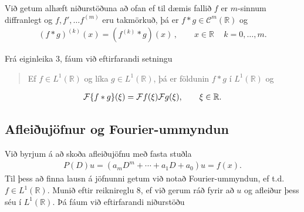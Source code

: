 \documentclass[a4paper,10pt,icelandic]{sphinxmanual}
\begin{document}
Við getum alhæft niðurstöðuna að ofan ef til dæmis fallið \(f\) er \(m\)-sinnum diffranlegt og \(f, f', \dots f^{(m)}\) eru takmörkuð, þá er \(f\ast g \in\mathcal{C}^m(\mathbb{R})\) og
\begin{equation*}
\begin{split}(f\ast g)^{(k)}(x)= (f^{(k)}\ast g)(x)\,, \qquad x\in\mathbb{R}\, \quad k=0, \dots, m.\end{split}
\end{equation*}

Frá eiginleika 3, fáum við eftirfarandi setningu
\begin{quote}

Ef \(f\in L^1(\mathbb R)\) og líka \(g\in L^1(\mathbb R)\), þá er földunin \(f\ast g\) í \(L^1(\mathbb R)\) og
\end{quote}
\begin{equation*}
\begin{split}{{\cal F}}\{f\ast g\}(\xi)={{\cal F}}f(\xi){{\cal F}}g(\xi), \qquad \xi\in {{\mathbb  R}}.\end{split}
\end{equation*}

\subsection{Afleiðujöfnur og Fourier-ummyndun}
\label{\detokenize{Kafli04:afleiujofnur-og-fourier-ummyndun}}
Við byrjum á að skoða afleiðujöfnu með fasta stuðla
\begin{equation*}
\begin{split}P(D)u=(a_mD^ m+\cdots+a_1D+a_0)u=f(x).\end{split}
\end{equation*}
Til þess að finna lausn á jöfnunni getum við notað Fourier-ummyndun, ef t.d. \(f\in L^1(\mathbb R)\). Munið eftir reiknireglu 8, ef við gerum ráð fyrir að \(u\) og afleiður þess séu í \(L^1(\mathbb R)\). Þá fáum við eftirfarandi niðurstöðu
\end{document}
